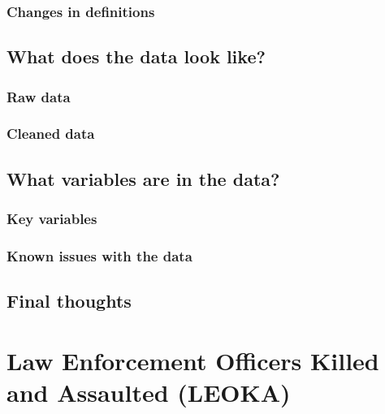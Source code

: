 \documentclass[
  12pt,
  openany]{book}
\begin{document}
\hypertarget{changes-in-definitions}{%
\subsection{Changes in definitions}\label{changes-in-definitions}}

\hypertarget{what-does-the-data-look-like}{%
\section{What does the data look like?}\label{what-does-the-data-look-like}}

\hypertarget{raw-data}{%
\subsection{Raw data}\label{raw-data}}

\hypertarget{cleaned-data}{%
\subsection{Cleaned data}\label{cleaned-data}}

\hypertarget{what-variables-are-in-the-data}{%
\section{What variables are in the data?}\label{what-variables-are-in-the-data}}

\hypertarget{key-variables}{%
\subsection{Key variables}\label{key-variables}}

\hypertarget{known-issues-with-the-data}{%
\subsection{Known issues with the data}\label{known-issues-with-the-data}}

\hypertarget{final-thoughts}{%
\section{Final thoughts}\label{final-thoughts}}

\hypertarget{leoka}{%
\chapter{Law Enforcement Officers Killed and Assaulted (LEOKA)}\label{leoka}}
\end{document}
